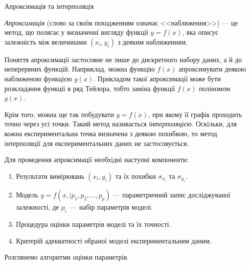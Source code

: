 \documentclass{LabBook}
\begin{document}
\begin{More}{Апроксимація та інтерполяція}

	\emph{Апроксимація} (слово за своїм походженням означає <<наближення>>) --- це метод, що полягає у визначенні вигляду функції $y = f(x)$, яка описує залежність між величинами  $(x_i, y_i)$ з деяким наближенням.

	Поняття апроксимації застосовне не лише до дискретного набору даних, а й до неперервних функцій. Наприклад, можна функцію $f(x)$ апроксимувати деякою наближеною функцією $g(x)$. Прикладом такої апроксимації може бути розкладання функції в ряд Тейлора, тобто заміна функції  $f(x)$ поліномом $g(x)$.

	Крім того, можна ще так побудувати $y = f(x)$, при якому її графік проходить точно через усі точки. Такий метод називається \emph{інтерполяцією}. Оскільки, для кожна експериментальна точка визначена з деякою похибкою, то метод інтерполяції для експериментальних даних не застосовується.
\end{More}


%



Для проведення апроксимації необхідні наступні компоненти:
\begin{enumerate}
	\item Результати вимірювань $(x_i, y_i)$ та їх похибки $\sigma_{x_i}$ та $\sigma_{y_i}$.
	\item Модель $y = f(x, | p_1, p_2, \ldots, p_p)$ --- параметричний запис досліджуваної залежності, де $p_i$~--- набір параметрів моделі.
	\item Процедура оцінки параметрів моделі та їх точності.
	\item Критерій адекватності обраної моделі експериментальним даним.
\end{enumerate}
Розглянемо алгоритми оцінки параметрів.
\end{document}
